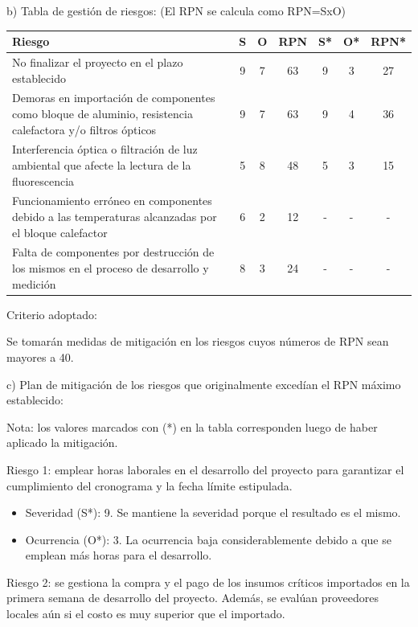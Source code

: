 \documentclass[
11pt, %
]{charter}
\begin{document}
b) Tabla de gestión de riesgos:      (El RPN se calcula como RPN=SxO)

\begin{table}[htpb]
\centering
\begin{tabularx}{\linewidth}{@{}|X|c|c|c|c|c|c|@{}}
\hline
\rowcolor[HTML]{C0C0C0} 
Riesgo & S & O & RPN & S* & O* & RPN* \\ \hline
No finalizar el proyecto en el plazo establecido       &  9 & 7  &  63   &  9  &  3  &   27   \\ \hline
Demoras en importación de componentes como bloque de aluminio, resistencia calefactora y/o filtros ópticos       &9   &  7 &  63   &  9  & 4   &   36   \\ \hline
Interferencia óptica o filtración de luz ambiental que afecte la lectura de la fluorescencia       & 5  & 8  &  48   &  5  &  3  &  15    \\ \hline
Funcionamiento erróneo en componentes debido a las temperaturas alcanzadas por el bloque calefactor       & 6  & 2  &  12   &  -  & -   &     - \\ \hline
Falta de componentes por destrucción de los mismos en el proceso de desarrollo y medición       & 8  & 3  &  24   & -   &  -  &   -   \\ \hline
\end{tabularx}%
\end{table}


Criterio adoptado: 

Se tomarán medidas de mitigación en los riesgos cuyos números de RPN sean mayores a 40.

c) Plan de mitigación de los riesgos que originalmente excedían el RPN máximo establecido:

Nota: los valores marcados con (*) en la tabla corresponden luego de haber aplicado la mitigación.


Riesgo 1: emplear horas laborales en el desarrollo del proyecto para garantizar el cumplimiento del cronograma y la fecha límite estipulada. 

\begin{itemize}
\item Severidad (S*): 9. Se mantiene la severidad porque el resultado es el mismo.

\item Ocurrencia (O*): 3. La ocurrencia baja considerablemente debido a que se emplean más horas para el desarrollo.
\end{itemize}

Riesgo 2: se gestiona la compra y el pago de los insumos críticos importados en la primera semana de desarrollo del proyecto. Además, se evalúan proveedores locales aún si el costo es muy superior que el importado.
\end{document}
